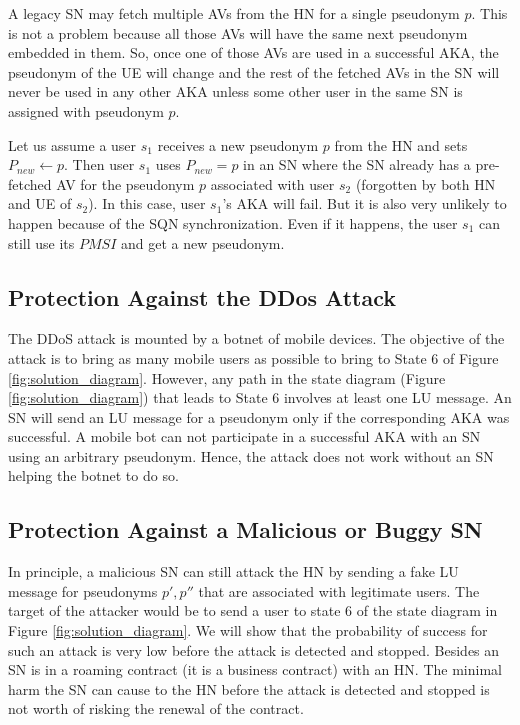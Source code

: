 \documentclass{llncs} %
\begin{document}
A legacy SN may fetch multiple AVs from the HN for a single pseudonym $p$. This is not a problem because all those AVs will have the same next pseudonym embedded in them. So, once one of those AVs are used in a successful AKA, the pseudonym of the UE will change and the rest of the fetched AVs in the SN will never be used in any other AKA unless some other user in the same SN is assigned with pseudonym $p$.

Let us assume a user $s_1$ receives a new pseudonym $p$ from the HN and sets $P_{new} \leftarrow p$. Then user $s_1$ uses $P_{new}=p$ in an SN where the SN already has a pre-fetched AV for the pseudonym $p$ associated with user $s_2$ (forgotten by both HN and UE of $s_2$). In this case, user $s_1$'s AKA will fail. But it is also very unlikely to happen because of the SQN synchronization. Even if it happens, the user $s_1$ can still use its $PMSI$ and get a new pseudonym.

\subsection{Protection Against the DDos Attack} The DDoS attack is mounted by a botnet of mobile devices. The objective of the attack is to bring as many mobile users as possible to bring to State $6$ of Figure \ref{fig:solution_diagram}. However, any path in the state diagram (Figure \ref{fig:solution_diagram}) that leads to State $6$ involves at least one LU message. An SN will send an LU message for a pseudonym only if the corresponding AKA was successful. A mobile bot can not participate in a successful AKA with an SN using an arbitrary pseudonym. Hence, the attack does not work without an SN helping the botnet to do so.


\subsection{Protection Against a Malicious or Buggy SN} \label{sec:attack_by_malicious_buggy_SN}
In principle, a malicious SN can still attack the HN by sending a fake LU message for pseudonyms $p',p''$ that are associated with legitimate users. The target of the attacker would be to send a user to state $6$ of the state diagram in Figure \ref{fig:solution_diagram}. We will show that the probability of success for such an attack is very low before the attack is detected and stopped. Besides an SN is in a roaming contract (it is a business contract) with an HN. The minimal harm the SN can cause to the HN before the attack is detected and stopped is not worth of risking the renewal of the contract.
\end{document}
